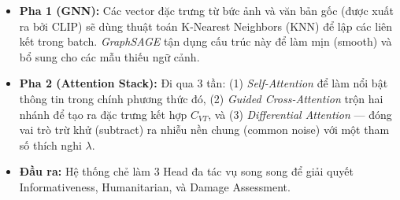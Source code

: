 \documentclass[12pt,a4paper]{article}
\begin{document}
\vspace{1cm}
\begin{itemize}
    \item \textbf{Pha 1 (GNN):} Các vector đặc trưng từ bức ảnh và văn bản gốc (được xuất ra bởi CLIP) sẽ dùng thuật toán K-Nearest Neighbors (KNN) để lập các liên kết trong batch. \textit{GraphSAGE} tận dụng cấu trúc này để làm mịn (smooth) và bổ sung cho các mẫu thiếu ngữ cảnh.
    \item \textbf{Pha 2 (Attention Stack):} Đi qua 3 tần: (1) \textit{Self-Attention} để làm nổi bật thông tin trong chính phương thức đó, (2) \textit{Guided Cross-Attention} trộn hai nhánh để tạo ra đặc trưng kết hợp $C_{VT}$, và (3) \textit{Differential Attention} — đóng vai trò trừ khử (subtract) ra nhiễu nền chung (common noise) với một tham số thích nghi $\lambda$.
    \item \textbf{Đầu ra:} Hệ thống chẻ làm 3 Head đa tác vụ song song để giải quyết Informativeness, Humanitarian, và Damage Assessment.
\end{itemize}
\end{document}
